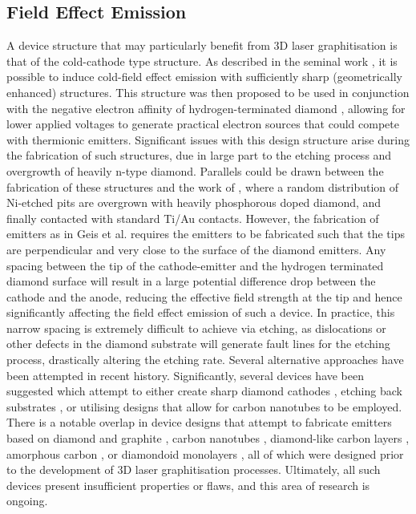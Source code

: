 \begin{refsection}
\subsection{Field Effect Emission}
\label{subsec:field_effect_emission}
A device structure that may particularly benefit from 3D laser graphitisation is that of the cold-cathode type structure. As described in the seminal work \cite{spindt1976}, it is possible to induce cold-field effect emission with sufficiently sharp (geometrically enhanced) structures. This structure was then proposed to be used in conjunction with the negative electron affinity of hydrogen-terminated diamond \cite{geis1996}, allowing for lower applied voltages to generate practical electron sources that could compete with thermionic emitters. Significant issues with this design structure arise during the fabrication of such structures, due in large part to the etching process and overgrowth of heavily n-type diamond. Parallels could be drawn between the fabrication of these structures and the work of \cite{temahuki2017}, where a random distribution of Ni-etched pits are overgrown with heavily phosphorous doped diamond, and finally contacted with standard Ti/Au contacts. However, the fabrication of emitters as in Geis et al. requires the emitters to be fabricated such that the tips are perpendicular and very close to the surface of the diamond emitters. Any spacing between the tip of the cathode-emitter and the hydrogen terminated diamond surface will result in a large potential difference drop between the cathode and the anode, reducing the effective field strength at the tip and hence significantly affecting the field effect emission of such a device. In practice, this narrow spacing is extremely difficult to achieve via etching, as dislocations or other defects in the diamond substrate will generate fault lines for the etching process, drastically altering the etching rate. Several alternative approaches have been attempted in recent history. Significantly, several devices have been suggested which attempt to either create sharp diamond cathodes \cite{davidson2007diamond}, etching back substrates \cite{sakuma2000manufacturing}, or utilising designs that allow for carbon nanotubes to be employed. There is a notable overlap in device designs that attempt to fabricate emitters based on diamond and graphite \cite{ono2008cold, sakai2004cold}, carbon nanotubes \cite{dimitrijevic2005diamond}, diamond-like carbon layers \cite{goel2002electrically}, amorphous carbon \cite{falabella2001amorphous}, or diamondoid monolayers \cite{yang2013diamondoid}, all of which were designed prior to the development of 3D laser graphitisation processes. Ultimately, all such devices present insufficient properties or flaws, and this area of research is ongoing.


\end{refsection}
